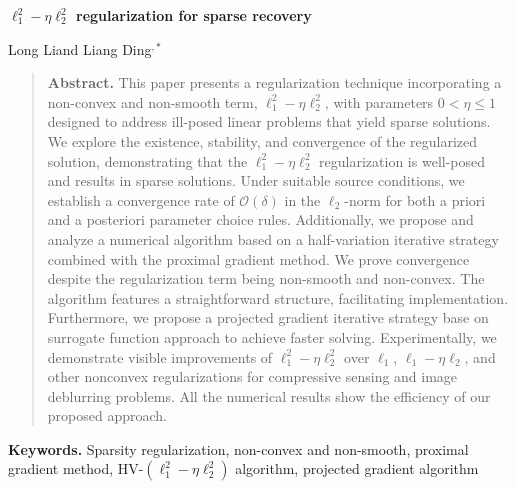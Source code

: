 \documentclass[a4paper,12pt]{article}
\numberwithin{equation}{section}
\begin{document}
\begin{center}
\Large\bf $\ell_{1}^{2}-\eta\ell_{2}^{2}$ regularization for sparse recovery
\end{center}

\begin{center}
Long Li\footnotemark[1] \quad and \quad Liang Ding\footnotemark[2]$^{,*}$


\renewcommand{\thefootnote}{\fnsymbol{footnote}}
\renewcommand{\thefootnote}{\arabic{footnote}}
\end{center}

\medskip
\begin{quote}
{\bf Abstract.}
This paper presents a regularization technique incorporating a non-convex and non-smooth term, $\ell_{1}^{2}-\eta\ell_{2}^{2}$, with parameters $0<\eta\leq 1$ designed to address ill-posed linear problems that yield sparse solutions. We explore the existence, stability, and convergence of the regularized solution, demonstrating that the $\ell_{1}^{2}-\eta\ell_{2}^{2}$ regularization is well-posed and results in sparse solutions. Under suitable source conditions, we establish a convergence rate of $\mathcal{O}\left(\delta\right)$ in the $\ell_{2}$-norm for both a priori and a posteriori parameter choice rules. Additionally, we propose and analyze a numerical algorithm based on a half-variation iterative strategy combined with the proximal gradient method. We prove convergence despite the regularization term being non-smooth and non-convex. The algorithm features a straightforward structure, facilitating implementation. Furthermore, we propose a projected gradient iterative strategy base on surrogate function approach to achieve faster solving. Experimentally, we demonstrate visible improvements of $\ell_{1}^{2}-\eta\ell_{2}^{2}$ over $\ell_{1}$, $\ell_{1}-\eta\ell_{2}$, and other nonconvex regularizations for compressive sensing and image deblurring problems. All the numerical results show the efficiency of our proposed approach.
\end{quote}

\smallskip
{\bf Keywords.} Sparsity regularization, non-convex and non-smooth, proximal gradient method, HV-$\left(\ell_{1}^{2}-\eta\ell_{2}^{2}\right)$ algorithm, projected gradient algorithm
\end{document}
